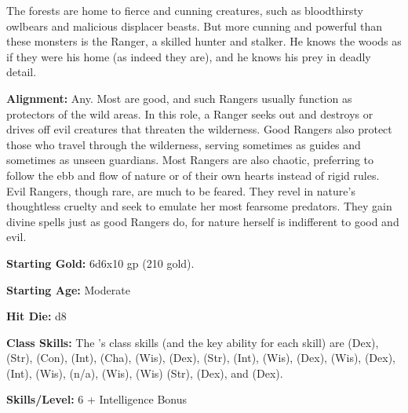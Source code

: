 
The forests are home to fierce and cunning creatures, such as bloodthirsty owlbears and malicious displacer beasts. But more cunning and powerful than these monsters is the Ranger, a skilled hunter and stalker. He knows the woods as if they were his home (as indeed they are), and he knows his prey in deadly detail.

\textbf{Alignment:} Any. Most are good, and such Rangers usually function as protectors of the wild areas. In this role, a Ranger seeks out and destroys or drives off evil creatures that threaten the wilderness. Good Rangers also protect those who travel through the wilderness, serving sometimes as guides and sometimes as unseen guardians. Most Rangers are also chaotic, preferring to follow the ebb and flow of nature or of their own hearts instead of rigid rules. Evil Rangers, though rare, are much to be feared. They revel in nature’s thoughtless cruelty and seek to emulate her most fearsome predators. They gain divine spells just as good Rangers do, for nature herself is indifferent to good and evil.

\textbf{Starting Gold:} 6d6x10 gp (210 gold).

\textbf{Starting Age:} Moderate

\textbf{Hit Die:} d8

\textbf{Class Skills:} The \currentclassname{}'s class skills (and the key ability for each skill) are  (Dex),  (Str),  (Con),  (Int),  (Cha),  (Wis),  (Dex),  (Str),  (Int),  (Wis),  (Dex),  (Wis),  (Dex),  (Int),  (Wis),  (n/a),  (Wis),  (Wis)  (Str),  (Dex), and  (Dex).

\textbf{Skills/Level:} 6 + Intelligence Bonus

\goodbab{}
\goodfor{}
\goodref{}
\poorwil{}

